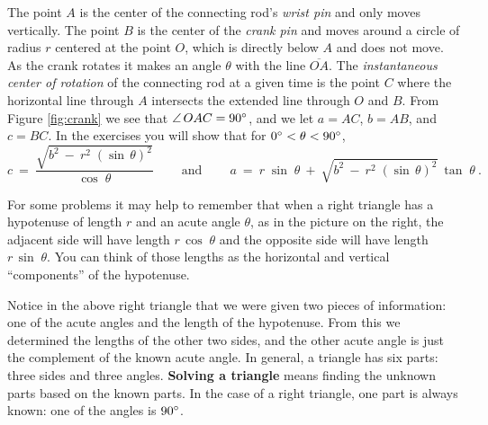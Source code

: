 \begin{exmp}
The point $A$ is the center of the connecting rod's \emph{wrist pin} and only moves vertically.
The point $B$ is the center of the \emph{crank pin} and moves around a circle of radius $r$ centered
at the point $O$, which is directly below $A$ and does not move. As the crank rotates it makes an
angle $\theta$ with the line $\overline{OA}$.
The \emph{instantaneous center of rotation} of the
connecting rod at a given time is the point $C$ where the horizontal line through $A$ intersects the
extended line through $O$ and $B$.
From Figure \ref{fig:crank} we see that $\angle\,OAC = 90^\circ$, and we let
$a = AC$, $b = AB$, and $c = BC$. In the exercises you will show that for
$0^\circ < \theta < 90^\circ$,
\begin{displaymath}
 c ~=~ \frac{\sqrt{b^2 ~-~ r^2 \;(\sin\,\theta)^2}}{\cos\;\theta} ~\qquad\text{and}\qquad~
 a ~=~ r\;\sin\;\theta ~+~ \sqrt{b^2 ~-~ r^2 \;(\sin\,\theta)^2}~\tan\;\theta ~.
\end{displaymath}
\end{exmp}
\divider
\newpage
{}
For some problems it may help to remember that when a right triangle has a hypotenuse of length $r$
and an acute angle $\theta$, as in the picture on the right, the adjacent side will have length
$r\,\cos\;\theta$ and the opposite side will have length $r\,\sin\;\theta$. You can think of those
lengths as the horizontal and vertical ``components'' of the hypotenuse.

Notice in the above right triangle that we were given two pieces of information: one of the acute
angles and the length of the hypotenuse. From this we determined the lengths of the other two
sides, and the other acute angle is just the complement of the known acute angle. In general, a
triangle has six parts: three sides and three angles. \textbf{Solving a triangle} means finding the unknown parts based on the known parts. In the case of a right triangle,
one part is always known: one of the angles is $90^\circ$.

